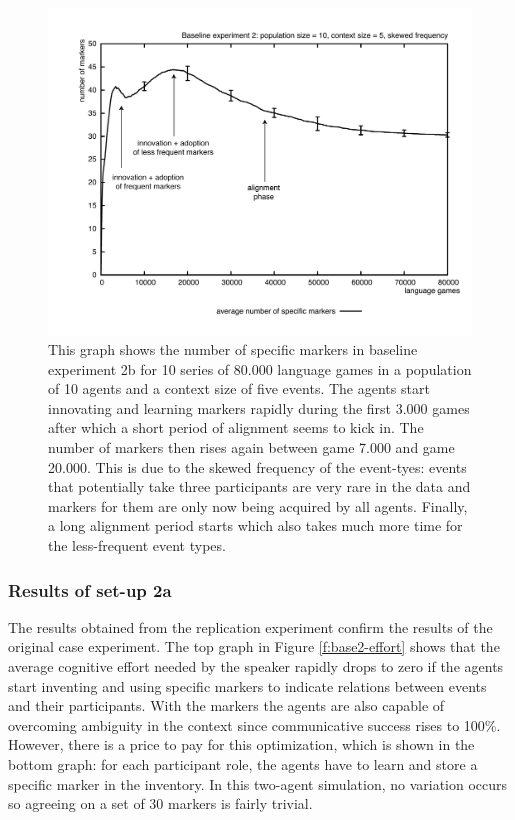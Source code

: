 \begin{figure}[phtb]
\centerline{\includegraphics[width=\textwidth]{Chapter3/figs/graph-base2-size1}}
  \caption[Baseline experiment 2: number of markers (skewed frequency)]{This graph shows the number of specific markers in baseline experiment 2b for 10 series of 80.000 language games in a population of 10 agents and a context size of five events. The agents start innovating and learning markers rapidly during the first 3.000 games after which a short period of alignment seems to kick in. The number of markers then rises again between game 7.000 and game 20.000. This is due to the skewed frequency of the event-tyes: events that potentially take three participants are very rare in the data and markers for them are only now being acquired by all agents. Finally, a long alignment period starts which also takes much more time for the less-frequent event types.}
   \label{f:base2-size1}
\end{figure}
\subsubsection{Results of set-up 2a}
 The results obtained from the replication experiment confirm the results of the original case experiment. The top graph in Figure \ref{f:base2-effort} shows that the average cognitive effort needed by the speaker rapidly drops to zero if the agents start inventing and using specific markers to indicate relations between events and their participants. With the markers the agents are also capable of overcoming ambiguity in the context since communicative success rises to 100\%. However, there is a price to pay for this optimization, which is shown in the bottom graph: for each participant role, the agents have to learn and store a specific marker in the inventory. In this two-agent simulation, no variation occurs so agreeing on a set of 30 markers is fairly trivial.


